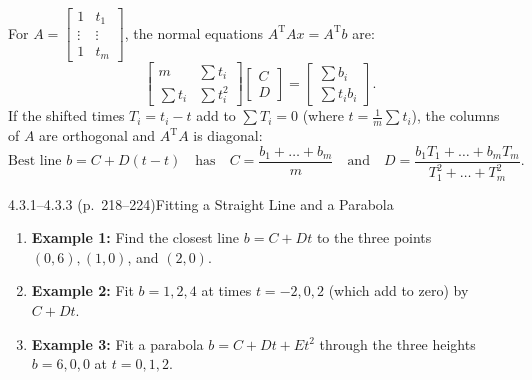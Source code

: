 \documentclass[11pt,a4paper,openany,oneside]{book}
\def\vect#1{#1}%
\def\uv#1{#1}%
\def\mathbf#1{#1}%
\newcommand{\vect}[1]{\mathbf{#1}}
\newcommand{\uv}[1]{\hat{\mathbf{#1}}}
\newcommand{\T}{\mathrm{T}}
\numberwithin{equation}{chapter}
\begin{document}
\begin{result}
For $A = \begin{bmatrix}1 & t_1\\\vdots & \vdots\\1 & t_m\end{bmatrix}$, the normal equations $A^\T A\uv{\vect{x}} = A^\T\vect{b}$ are:
\begin{equation}
\begin{bmatrix} m & \sum t_i \\ \sum t_i & \sum t_i^2 \end{bmatrix} \begin{bmatrix} C \\ D \end{bmatrix} = \begin{bmatrix} \sum b_i \\ \sum t_i b_i \end{bmatrix}.
\end{equation}
If the shifted times $T_i = t_i - \uv{t}$ add to $\sum T_i = 0$ (where $\uv{t} = \frac{1}{m}\sum t_i$), the columns of $A$ are orthogonal and $A^\T A$ is diagonal:
\begin{equation}
\text{Best line } b = C + D(t - \uv{t}) \quad \text{has} \quad C = \frac{b_1 + \dots + b_m}{m} \quad \text{and} \quad D = \frac{b_1T_1 + \dots + b_mT_m}{T_1^2 + \dots + T_m^2}.
\end{equation}
\end{result}

\begin{example}{4.3.1--4.3.3 (p.\ 218--224)}{Fitting a Straight Line and a Parabola}
\begin{enumerate}
\item \textbf{Example 1:} Find the closest line $b = C + Dt$ to the three points $(0,6), (1,0)$, and $(2,0)$.
\item \textbf{Example 2:} Fit $b = 1, 2, 4$ at times $t = -2, 0, 2$ (which add to zero) by $C + Dt$.
\item \textbf{Example 3:} Fit a parabola $b = C + Dt + Et^2$ through the three heights $b = 6, 0, 0$ at $t = 0, 1, 2$.
\end{enumerate}
\end{example}
\end{document}
